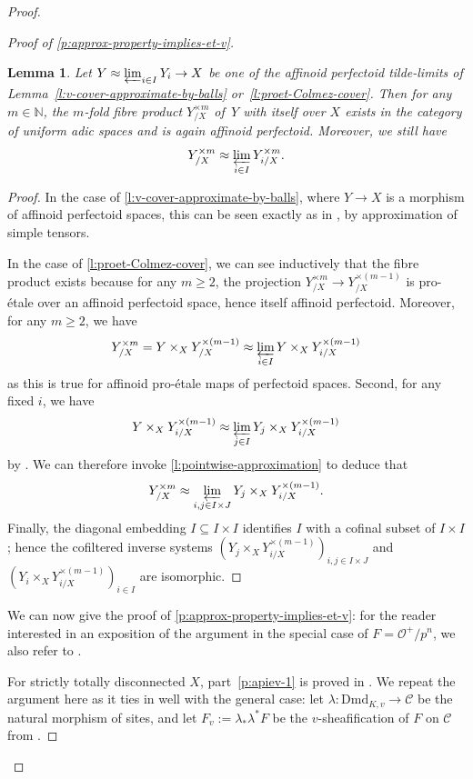 \documentclass[10pt,a4paper]{article}
\newtheorem{Lemma}[thm]{Lemma}
\theoremstyle{definition}
\theoremstyle{remark}
\newcommand{\N}{\mathbb{N}}
\renewcommand{\O}{\mathcal{O}}
\newcommand{\Dmd}{\mathrm{Dmd}}
\numberwithin{equation}{section}
\begin{document}
\begin{proof}
\begin{proof}[Proof of \cref{p:approx-property-implies-et-v}]
	\begin{Lemma}\label{l:product-of-tilde-limits}
		Let $Y\approx \varprojlim_{i\in I} Y_i\to X$ be one of the affinoid perfectoid  tilde-limits of  Lemma~\ref{l:v-cover-approximate-by-balls} or~\ref{l:proet-Colmez-cover}. Then
		for any $m\in \N$, the $m$-fold fibre product $ Y_{/X}^{\times m}$ of\, $Y$ with itself over $X$ exists in the category of uniform adic spaces and is again affinoid perfectoid. Moreover, we still have
			\[ Y_{/X}^{\times m}\approx \varprojlim_{i\in I} Y_{i/X}^{\times m}.\]
	\end{Lemma}
        
	\begin{proof}
		In the case of \cref{l:v-cover-approximate-by-balls}, where $Y\to X$ is a morphism of affinoid perfectoid spaces, this can be seen exactly as in \cite[Lemma 2.8]{perfectoid-covers-Arizona}, by approximation of simple tensors.
		
		In the case of \cref{l:proet-Colmez-cover}, we can see inductively that the fibre product exists because for any $m\geq 2$, the projection $Y^{\times m}_{/X}\to Y^{\times (m-1)}_{/X}$ is pro-\'etale over an affinoid perfectoid space, hence itself affinoid perfectoid. 
		Moreover, for any $m\geq 2$, we have 
			\[Y^{\times m}_{/X}=Y\times_{X}Y^{\times (m-1)}_{/X}\approx \varprojlim_{i\in I}Y\times_{X}Y^{\times (m-1)}_{i/X}\]
		as this is true for affinoid pro-\'etale maps of perfectoid spaces. Second, for any fixed $i$, we have
			\[Y\times_{X}Y^{\times(m-1)}_{i/X}\approx\varprojlim_{j\in I} Y_j\times_{X}Y^{\times(m-1)}_{i/X}\]
			 by \cite[Lemma 3.13]{heuer-diamantine-Picard}. 
			 We can therefore invoke  \cref{l:pointwise-approximation} to deduce that
			 \[ Y_{/X}^{\times m}\approx \varprojlim_{i,j\in I\times J} Y_j\times_{X}Y^{\times(m-1)}_{i/X}. \]
			  Finally, the diagonal embedding $I\subseteq I\times I$  identifies $I$ with  a cofinal subset of $I\times I$; hence the cofiltered inverse systems $(Y_j\times_{X}Y^{\times(m-1)}_{i/X})_{i,j\in I\times J}$ and $(Y_i\times_{X}Y^{\times(m-1)}_{i/X})_{i\in I}$ are isomorphic.
	\end{proof}

	We can now give the proof of \cref{p:approx-property-implies-et-v}: for the reader interested in an exposition of the argument in the special case of $F=\O^+/p^n$, we also refer to \cite[Appendix C]{Zavyalov_acoh}.	
		
		For strictly totally disconnected $X$, part~\eqref{p:apiev-1} is proved in \cite[Lemma 2.12]{MannWerner_LocSys_p-adVB}. We repeat the argument here as it ties in well with the general case: let $\lambda\colon \Dmd_{K,v}\to \mathcal C$ be the natural morphism of sites, and let $F_v:=\lambda_{\ast}\lambda^{\ast}F$ be the $v$-sheafification of $F$ on $\mathcal C$ from .
		

\end{proof}
\end{proof}
\end{document}
